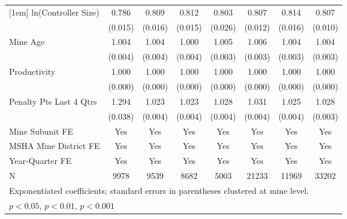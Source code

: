 {\begin{tabular}{l*{7}{c}}
[1em]
ln(Controller Size)      &       0.786\sym{***}&       0.809\sym{***}&       0.812\sym{***}&       0.803\sym{***}&       0.807\sym{***}&       0.814\sym{***}&       0.807\sym{***}\\
                         &     (0.015)         &     (0.016)         &     (0.015)         &     (0.026)         &     (0.012)         &     (0.016)         &     (0.010)         \\
[1em]
Mine Age                 &       1.004         &       1.004         &       1.000         &       1.005         &       1.006         &       1.004         &       1.004         \\
                         &     (0.004)         &     (0.004)         &     (0.004)         &     (0.003)         &     (0.003)         &     (0.003)         &     (0.003)         \\
[1em]
Productivity             &       1.000         &       1.000\sym{*}  &       1.000         &       1.000         &       1.000\sym{*}  &       1.000         &       1.000\sym{*}  \\
                         &     (0.000)         &     (0.000)         &     (0.000)         &     (0.000)         &     (0.000)         &     (0.000)         &     (0.000)         \\
[1em]
Penalty Pts Last 4 Qtrs  &       1.294\sym{***}&       1.023\sym{***}&       1.023\sym{***}&       1.028\sym{***}&       1.031\sym{***}&       1.025\sym{***}&       1.028\sym{***}\\
                         &     (0.038)         &     (0.004)         &     (0.004)         &     (0.004)         &     (0.004)         &     (0.004)         &     (0.003)         \\
[1em]
Mine Subunit FE          &         Yes         &         Yes         &         Yes         &         Yes         &         Yes         &         Yes         &         Yes         \\
[1em]
MSHA Mine District FE    &         Yes         &         Yes         &         Yes         &         Yes         &         Yes         &         Yes         &         Yes         \\
[1em]
Year-Quarter FE          &         Yes         &         Yes         &         Yes         &         Yes         &         Yes         &         Yes         &         Yes         \\
\hline
N                        &        9978         &        9539         &        8682         &        5003         &       21233         &       11969         &       33202         \\
\hline\hline
\multicolumn{8}{l}{\footnotesize Exponentiated coefficients; standard errors in parentheses clustered at mine level.}\\
\multicolumn{8}{l}{\footnotesize \sym{*} \(p<0.05\), \sym{**} \(p<0.01\), \sym{***} \(p<0.001\)}\\
\end{tabular}
}

